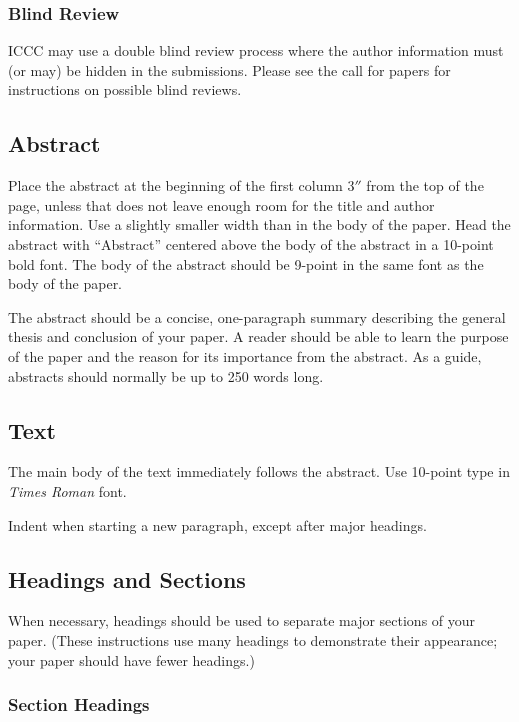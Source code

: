 \documentclass[letterpaper]{article}
\begin{document}
\subsubsection{Blind Review}

ICCC may use a double blind review process where the author information
must (or may) be hidden in the submissions. 
Please see the call for papers for instructions on possible blind reviews. 

\subsection{Abstract}

Place the abstract at the beginning of the first column 3$''$ from the
top of the page, unless that does not leave enough room for the title
and author information. Use a slightly smaller width than in the body
of the paper. Head the abstract with ``Abstract'' centered above the
body of the abstract in a 10-point bold font. The body of the abstract
should be 9-point in the same font as the body of the paper.

The abstract should be a concise, one-paragraph summary describing the
general thesis and conclusion of your paper. A reader should be able
to learn the purpose of the paper and the reason for its importance
from the abstract. As a guide, abstracts should normally be up to 250 words long.

\subsection{Text}

The main body of the text immediately follows the abstract. Use
10-point type in {\em Times Roman} font.

Indent when starting a new paragraph, except after major headings.

\subsection{Headings and Sections}

When necessary, headings should be used to separate major sections of
your paper. (These instructions use many headings to demonstrate their
appearance; your paper should have fewer headings.)

\subsubsection{Section Headings}
\end{document}
